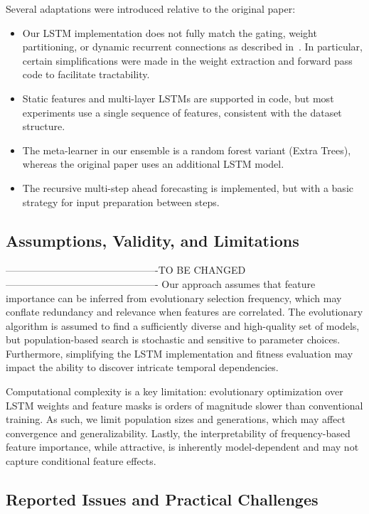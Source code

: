 \documentclass[12pt]{article}
\begin{document}
Several adaptations were introduced relative to the original paper:
\begin{itemize}
    \item Our LSTM implementation does not fully match the gating, weight partitioning, or dynamic recurrent connections as described in~\cite{espinosa2023efs}. In particular, certain simplifications were made in the weight extraction and forward pass code to facilitate tractability.
    \item Static features and multi-layer LSTMs are supported in code, but most experiments use a single sequence of features, consistent with the dataset structure.
    \item The meta-learner in our ensemble is a random forest variant (Extra Trees), whereas the original paper uses an additional LSTM model.
    \item The recursive multi-step ahead forecasting is implemented, but with a basic strategy for input preparation between steps.
\end{itemize}

\subsection{Assumptions, Validity, and Limitations}
----------------------------------------------TO BE CHANGED----------------------------------------------
Our approach assumes that feature importance can be inferred from evolutionary selection frequency, which may conflate redundancy and relevance when features are correlated. The evolutionary algorithm is assumed to find a sufficiently diverse and high-quality set of models, but population-based search is stochastic and sensitive to parameter choices. Furthermore, simplifying the LSTM implementation and fitness evaluation may impact the ability to discover intricate temporal dependencies.

Computational complexity is a key limitation: evolutionary optimization over LSTM weights and feature masks is orders of magnitude slower than conventional training. As such, we limit population sizes and generations, which may affect convergence and generalizability. Lastly, the interpretability of frequency-based feature importance, while attractive, is inherently model-dependent and may not capture conditional feature effects.

\subsection{Reported Issues and Practical Challenges}
\end{document}
